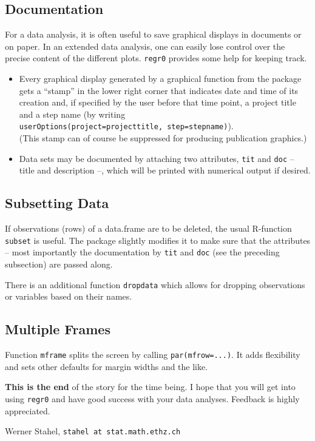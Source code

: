 \documentclass[11pt]{article}
\providecommand{\T}{\texttt}
\providecommand{\Tit}[1]{\textbf{#1}\hspace{1em}}
\begin{document}
\subsection{Documentation}
For a data analysis, it is often useful to save graphical displays in 
documents or on paper. In an extended data analysis, one can easily lose
control over the precise content of the different plots.
\T{regr0} provides some help for keeping track.
\begin{itemize}
\item 
  Every graphical display generated by a graphical function from the
  package gets a ``stamp'' in the lower right corner that indicates date
  and time of its creation and, if specified by the user before that 
  time point, a project title and a step name (by writing\\
  \T{userOptions(project=projecttitle, step=stepname)}).\\
  (This stamp can of course be suppressed for producing publication
  graphics.) 
\item
  Data sets may be documented by attaching two attributes, \T{tit} and 
  \T{doc} -- title and description --, which will be printed with
  numerical output if desired.
\end{itemize}

\subsection{Subsetting Data}
If observations (rows) of a data.frame are to be deleted, the usual
R-function \T{subset} is useful. The package slightly modifies it to make
sure that the attributes -- most importantly the documentation by
\T{tit} and \T{doc} (see the preceding subsection) are passed along.

There is an additional function \T{dropdata} which allows for dropping
observations or variables based on their names.

\subsection{Multiple Frames}
Function \T{mframe} splits the screen by calling \T{par(mfrow=...)}.
It adds flexibility and sets other defaults for margin widths and the like. 
\\[10mm]

{\small
\Tit{This is the end} of the story for the time being. I hope that you will
get into using \T{regr0} and have good success with your data analyses.
Feedback is highly appreciated.

Werner Stahel, \T{stahel at stat.math.ethz.ch}
}
\end{document}
